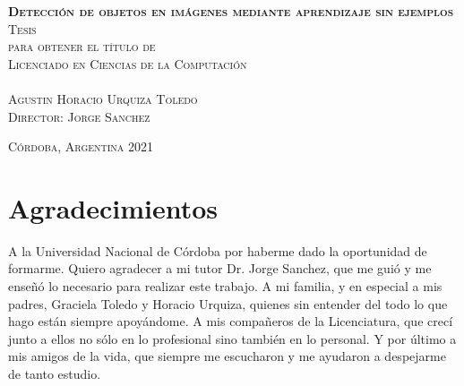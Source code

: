 \documentclass[12pt,twosided]{book}
\begin{document}
\begin{titlepage}
\begin{center}
\vspace{1em}

\textsc{\huge \textbf{Detección de objetos en imágenes mediante aprendizaje sin ejemplos}}\\[2em]

\textsc{\large Tesis}\\[1em]

\textsc{ para obtener el título de}\\[1em]

\textsc{Licenciado en Ciencias de la Computación}\\[1em]

\textsc{}\\[1em]

\textsc{\Large Agustin Horacio Urquiza Toledo}\\[1em]

\textsc{\large Director: Jorge Sanchez}

\end{center}

\vspace*{\fill}
\textsc{Córdoba, Argentina \hspace*{\fill} 2021}

\end{titlepage}

\pagestyle{empty}
\frontmatter

\begin{flushright}
\textit{}
\end{flushright}

\chapter*{Agradecimientos}
A la Universidad Nacional de Córdoba por haberme dado la
oportunidad de formarme. Quiero agradecer a mi tutor Dr. Jorge Sanchez, que me guió y me enseñó lo necesario para realizar este trabajo. A mi familia, y en especial a mis padres, Graciela Toledo y Horacio Urquiza, quienes sin entender del todo lo que hago están siempre apoyándome. A mis compañeros de la Licenciatura, que crecí junto a ellos no sólo en lo profesional sino también en lo personal. Y por último a mis amigos de la vida, que siempre me escucharon y me ayudaron a despejarme de tanto estudio.
\end{document}
